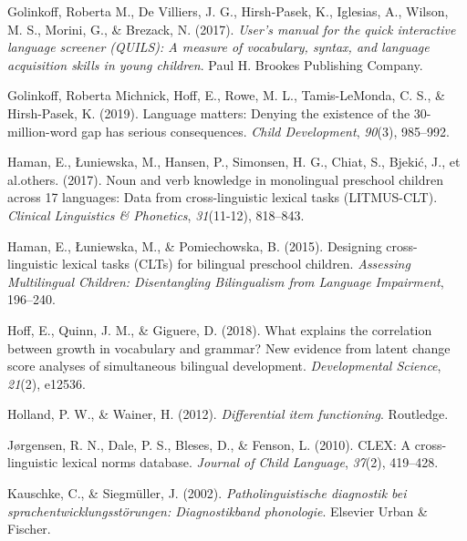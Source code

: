 \documentclass[
  man,floatsintext]{apa6}
\newlength{\cslhangindent}
\newlength{\cslentryspacingunit} %
\newenvironment{CSLReferences}[2] %
 {%
  \setlength{\parindent}{0pt}
  \ifodd #1
  \let\oldpar\par
  \def\par{\hangindent=\cslhangindent\oldpar}
  \fi
  \setlength{\parskip}{#2\cslentryspacingunit}
 }%
 {}
\begin{document}
\begin{CSLReferences}{1}{0}
\leavevmode{}%
Golinkoff, Roberta M., De Villiers, J. G., Hirsh-Pasek, K., Iglesias, A., Wilson, M. S., Morini, G., \& Brezack, N. (2017). \emph{User's manual for the quick interactive language screener (QUILS): A measure of vocabulary, syntax, and language acquisition skills in young children}. Paul H. Brookes Publishing Company.

\leavevmode{}%
Golinkoff, Roberta Michnick, Hoff, E., Rowe, M. L., Tamis-LeMonda, C. S., \& Hirsh-Pasek, K. (2019). Language matters: Denying the existence of the 30-million-word gap has serious consequences. \emph{Child Development}, \emph{90}(3), 985--992.

\leavevmode{}%
Haman, E., Łuniewska, M., Hansen, P., Simonsen, H. G., Chiat, S., Bjekić, J., et al.others. (2017). Noun and verb knowledge in monolingual preschool children across 17 languages: Data from cross-linguistic lexical tasks (LITMUS-CLT). \emph{Clinical Linguistics \& Phonetics}, \emph{31}(11-12), 818--843.

\leavevmode{}%
Haman, E., Łuniewska, M., \& Pomiechowska, B. (2015). Designing cross-linguistic lexical tasks (CLTs) for bilingual preschool children. \emph{Assessing Multilingual Children: Disentangling Bilingualism from Language Impairment}, 196--240.

\leavevmode{}%
Hoff, E., Quinn, J. M., \& Giguere, D. (2018). What explains the correlation between growth in vocabulary and grammar? New evidence from latent change score analyses of simultaneous bilingual development. \emph{Developmental Science}, \emph{21}(2), e12536.

\leavevmode{}%
Holland, P. W., \& Wainer, H. (2012). \emph{Differential item functioning}. Routledge.

\leavevmode{}%
Jørgensen, R. N., Dale, P. S., Bleses, D., \& Fenson, L. (2010). CLEX: A cross-linguistic lexical norms database. \emph{Journal of Child Language}, \emph{37}(2), 419--428.

\leavevmode{}%
Kauschke, C., \& Siegmüller, J. (2002). \emph{Patholinguistische diagnostik bei sprachentwicklungsst{ö}rungen: Diagnostikband phonologie}. Elsevier Urban \& Fischer.


\end{CSLReferences}
\end{document}
